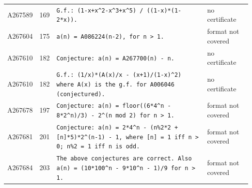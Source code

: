 \documentclass[11pt]{article}
\theoremstyle{definition}
\theoremstyle{remark}
\begin{document}
{\begin{longtable}{p{1.3cm}p{0.7cm}p{10cm}p{3cm}}
A267589 & 169 & \texttt{G.f.: \allowbreak{}(1-\allowbreak{}x+\allowbreak{}x\^{}2-\allowbreak{}x\^{}3+\allowbreak{}x\^{}5)\allowbreak{} \allowbreak{}/\allowbreak{} \allowbreak{}((1-\allowbreak{}x)\allowbreak{}*\allowbreak{}(1-\allowbreak{}2*\allowbreak{}x)\allowbreak{})\allowbreak{}.} & no certificate \\
A267604 & 175 & \texttt{a(n)\allowbreak{} \allowbreak{}=\allowbreak{} \allowbreak{}A086224(n-\allowbreak{}2)\allowbreak{},\allowbreak{} \allowbreak{}for \allowbreak{}n \allowbreak{}> \allowbreak{}1.} & format not covered \\
A267610 & 182 & \texttt{Conjecture: \allowbreak{}a(n)\allowbreak{} \allowbreak{}=\allowbreak{} \allowbreak{}A267700(n)\allowbreak{} \allowbreak{}-\allowbreak{} \allowbreak{}n.} & no certificate \\
A267610 & 182 & \texttt{G.f.: \allowbreak{}(1/\allowbreak{}x)\allowbreak{}*\allowbreak{}(A(x)\allowbreak{}/\allowbreak{}x \allowbreak{}-\allowbreak{} \allowbreak{}(x+\allowbreak{}1)\allowbreak{}/\allowbreak{}(1-\allowbreak{}x)\allowbreak{}\^{}2)\allowbreak{} \allowbreak{}where \allowbreak{}A(x)\allowbreak{} \allowbreak{}is \allowbreak{}the \allowbreak{}g.f. \allowbreak{}for \allowbreak{}A006046 \allowbreak{}(conjectured)\allowbreak{}.} & no certificate \\
A267678 & 197 & \texttt{Conjecture: \allowbreak{}a(n)\allowbreak{} \allowbreak{}=\allowbreak{} \allowbreak{}floor((6*\allowbreak{}4\^{}n \allowbreak{}-\allowbreak{} \allowbreak{}8*\allowbreak{}2\^{}n)\allowbreak{}/\allowbreak{}3)\allowbreak{} \allowbreak{}-\allowbreak{} \allowbreak{}2\^{}(n \allowbreak{}mod \allowbreak{}2)\allowbreak{} \allowbreak{}for \allowbreak{}n \allowbreak{}> \allowbreak{}1.} & format not covered \\
A267681 & 201 & \texttt{Conjecture: \allowbreak{}a(n)\allowbreak{} \allowbreak{}=\allowbreak{} \allowbreak{}2*\allowbreak{}4\^{}n \allowbreak{}-\allowbreak{} \allowbreak{}(n\%2*\allowbreak{}2 \allowbreak{}+\allowbreak{} \allowbreak{}[n]*\allowbreak{}5)\allowbreak{}*\allowbreak{}2\^{}(n-\allowbreak{}1)\allowbreak{} \allowbreak{}-\allowbreak{} \allowbreak{}1,\allowbreak{} \allowbreak{}where \allowbreak{}[n] \allowbreak{}=\allowbreak{} \allowbreak{}1 \allowbreak{}iff \allowbreak{}n \allowbreak{}> \allowbreak{}0; \allowbreak{}n\%2 \allowbreak{}=\allowbreak{} \allowbreak{}1 \allowbreak{}iff \allowbreak{}n \allowbreak{}is \allowbreak{}odd.} & format not covered \\
A267684 & 203 & \texttt{The \allowbreak{}above \allowbreak{}conjectures \allowbreak{}are \allowbreak{}correct. \allowbreak{}Also \allowbreak{}a(n)\allowbreak{} \allowbreak{}=\allowbreak{} \allowbreak{}(10*\allowbreak{}100\^{}n \allowbreak{}-\allowbreak{} \allowbreak{}9*\allowbreak{}10\^{}n \allowbreak{}-\allowbreak{} \allowbreak{}1)\allowbreak{}/\allowbreak{}9 \allowbreak{}for \allowbreak{}n \allowbreak{}> \allowbreak{}1.} & format not covered \\

\end{longtable}}
\end{document}
